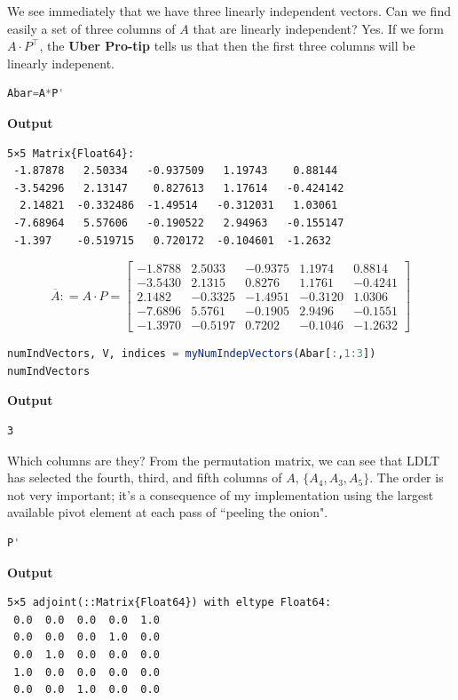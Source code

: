 We see immediately that we have three linearly independent vectors. Can we find easily a set of three columns of $A$ that are linearly independent? Yes. If we form $A \cdot P^\top$, the \textbf{Uber Pro-tip} tells us that then the first three columns will be linearly indepenent.  
\begin{lstlisting}[language=Julia,style=mystyle]
Abar=A*P'
\end{lstlisting}
\textbf{Output} 
\begin{verbatim}
5×5 Matrix{Float64}:
 -1.87878   2.50334   -0.937509   1.19743    0.88144
 -3.54296   2.13147    0.827613   1.17614   -0.424142
  2.14821  -0.332486  -1.49514   -0.312031   1.03061
 -7.68964   5.57606   -0.190522   2.94963   -0.155147
 -1.397    -0.519715   0.720172  -0.104601  -1.2632
\end{verbatim}

\begin{equation}
\overline{A}: = A \cdot P =\left[
\begin{array}{rrrrr}
-1.8788 & 2.5033 & -0.9375 & 1.1974 & 0.8814 \\
-3.5430 & 2.1315 & 0.8276 & 1.1761 & -0.4241 \\
2.1482 & -0.3325 & -1.4951 & -0.3120 & 1.0306 \\
-7.6896 & 5.5761 & -0.1905 & 2.9496 & -0.1551 \\
-1.3970 & -0.5197 & 0.7202 & -0.1046 & -1.2632 
\end{array}
\right]
\end{equation}

\begin{lstlisting}[language=Julia,style=mystyle]
numIndVectors, V, indices = myNumIndepVectors(Abar[:,1:3])
numIndVectors
\end{lstlisting}
\textbf{Output} 
\begin{verbatim}
3
\end{verbatim}

Which columns are they? From the permutation matrix, we can see that LDLT has selected the fourth, third, and fifth columns of $A$, $\{A_4, A_3, A_5 \}$. The order is not very important; it's a consequence of my implementation using the largest available pivot element at each pass of ``peeling the onion". \\

\begin{lstlisting}[language=Julia,style=mystyle]
P'
\end{lstlisting}
\textbf{Output} 
\begin{verbatim}
5×5 adjoint(::Matrix{Float64}) with eltype Float64:
 0.0  0.0  0.0  0.0  1.0
 0.0  0.0  0.0  1.0  0.0
 0.0  1.0  0.0  0.0  0.0
 1.0  0.0  0.0  0.0  0.0
 0.0  0.0  1.0  0.0  0.0
\end{verbatim}

